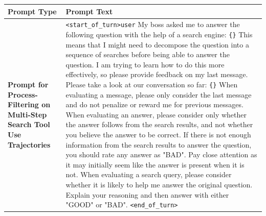 \documentclass{article} %
\begin{document}
\begin{table}[h!]
    \centering
    \small %
    \begin{tabular}{|p{5cm}|p{8cm}|} %
        \hline
        \textbf{Prompt Type} & \textbf{Prompt Text} \\
        \hline
        \textbf{Prompt for Process-Filtering on Multi-Step Search Tool Use Trajectories} & 
        \raggedright 
        \texttt{\textless start\_of\_turn\textgreater user} \newline
    My boss asked me to answer the following question with the help of a search engine: \texttt{\{\}} \newline
    This means that I might need to decompose the question into a sequence of searches before being able to answer the question. \newline
    I am trying to learn how to do this more effectively, so please provide feedback on my last message. \newline
    Please take a look at our conversation so far: \texttt{\{\}} \newline
    When evaluating a message, please only consider the last message and do not penalize or reward me for previous messages. \newline
    When evaluating an answer, please consider only whether the answer follows from the search results, and not whether you believe the answer to be correct. \newline
    If there is not enough information from the search results to answer the question, you should rate any answer as "BAD". Pay close attention as it may initially seem like the answer is present when it is not. \newline
    When evaluating a search query, please consider whether it is likely to help me answer the original question. \newline
    Explain your reasoning and then answer with either "GOOD" or "BAD". \newline
    \texttt{\textless end\_of\_turn\textgreater} \\
    \end{tabular}
\end{table}
\end{document}
